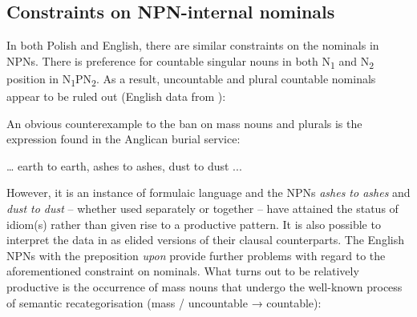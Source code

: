 \documentclass[output=paper]{langscibook}
\begin{document}
\subsection{Constraints on NPN-internal nominals}\label{psk:sec:constraints}

In both Polish and English, there are similar constraints on the nominals in NPNs. There is preference for countable singular nouns in  both N\textsubscript{1} and N\textsubscript{2} position in N\textsubscript{1}PN\textsubscript{2}. As a result, uncountable  and plural countable nominals  appear to be ruled out (English data from \citealt{Jackendoff2008}):

\ea \label{psk:ex:2}  \label{psk:ex:key:2a}
\z\z

\ea \label{psk:ex:key:3}  \label{psk:ex:key:3a}
\z
\z

\noindent An obvious counterexample to the ban on mass nouns  and plurals  is the expression found in the Anglican burial service:

\ea \label{psk:ex:key:4}  … earth to earth, ashes to ashes, dust to dust ...\\
\z

\noindent However, it is an instance of formulaic language and the NPNs \textit{ashes to ashes} and \textit{dust to dust} – whether used separately or together – have attained the status of idiom(s) rather than given rise to a productive pattern. It is also possible to interpret the data in  as elided versions of their clausal counterparts. The English NPNs with the preposition \textit{upon} provide further problems with regard to the aforementioned constraint on nominals. What turns out to be relatively productive is the occurrence of mass nouns that undergo the well-known process of semantic recategorisation (mass / uncountable → countable):
\end{document}
